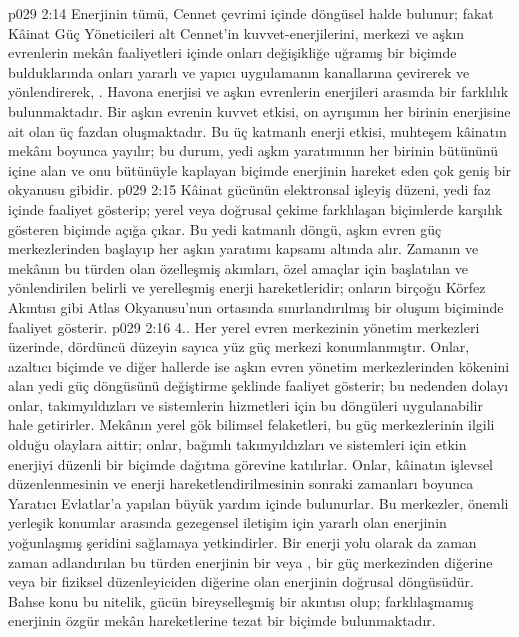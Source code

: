 \vs p029 2:14 Enerjinin tümü, Cennet çevrimi içinde döngüsel halde bulunur; fakat Kâinat Güç Yöneticileri alt Cennet’in kuvvet\hyp{}enerjilerini, merkezi ve aşkın evrenlerin mekân faaliyetleri içinde onları değişikliğe uğramış bir biçimde bulduklarında onları yararlı ve yapıcı uygulamanın kanallarına çevirerek ve yönlendirerek, . Havona enerjisi ve aşkın evrenlerin enerjileri arasında bir farklılık bulunmaktadır. Bir aşkın evrenin kuvvet etkisi, on ayrışımın her birinin enerjisine ait olan üç fazdan oluşmaktadır. Bu üç katmanlı enerji etkisi, muhteşem kâinatın mekânı boyunca yayılır; bu durum, yedi aşkın yaratımının her birinin bütününü içine alan ve onu bütünüyle kaplayan biçimde enerjinin hareket eden çok geniş bir okyanusu gibidir.
\vs p029 2:15 Kâinat gücünün elektronsal işleyiş düzeni, yedi faz içinde faaliyet gösterip; yerel veya doğrusal çekime farklılaşan biçimlerde karşılık gösteren biçimde açığa çıkar. Bu yedi katmanlı döngü, aşkın evren güç merkezlerinden başlayıp her aşkın yaratımı kapsamı altında alır. Zamanın ve mekânın bu türden olan özelleşmiş akımları, özel amaçlar için başlatılan ve yönlendirilen belirli ve yerelleşmiş enerji hareketleridir; onların birçoğu Körfez Akıntısı gibi Atlas Okyanusu’nun ortasında sınırlandırılmış bir oluşum biçiminde faaliyet gösterir.
\vs p029 2:16 4.\bibnobreakspace {}. Her yerel evren merkezinin yönetim merkezleri üzerinde, dördüncü düzeyin sayıca yüz güç merkezi konumlanmıştır. Onlar, azaltıcı biçimde ve diğer hallerde ise aşkın evren yönetim merkezlerinden kökenini alan yedi güç döngüsünü değiştirme şeklinde faaliyet gösterir; bu nedenden dolayı onlar, takımyıldızları ve sistemlerin hizmetleri için bu döngüleri uygulanabilir hale getirirler. Mekânın yerel gök bilimsel felaketleri, bu güç merkezlerinin ilgili olduğu olaylara aittir; onlar, bağımlı takımyıldızları ve sistemleri için etkin enerjiyi düzenli bir biçimde dağıtma görevine katılırlar. Onlar, kâinatın işlevsel düzenlenmesinin ve enerji hareketlendirilmesinin sonraki zamanları boyunca Yaratıcı Evlatlar’a yapılan büyük yardım içinde bulunurlar. Bu merkezler, önemli yerleşik konumlar arasında gezegensel iletişim için yararlı olan enerjinin yoğunlaşmış şeridini sağlamaya yetkindirler. Bir enerji yolu olarak da zaman zaman adlandırılan bu türden enerjinin bir  veya , bir güç merkezinden diğerine veya bir fiziksel düzenleyiciden diğerine olan enerjinin doğrusal döngüsüdür. Bahse konu bu nitelik, gücün bireyselleşmiş bir akıntısı olup; farklılaşmamış enerjinin özgür mekân hareketlerine tezat bir biçimde bulunmaktadır.
